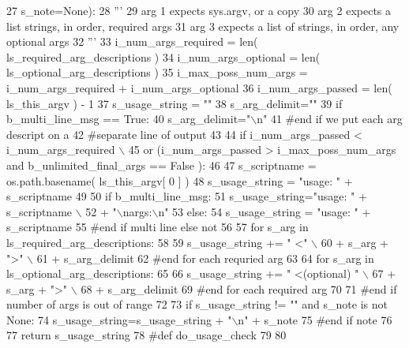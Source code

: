 \begin{DoxyCode}
27             s\_note=\textcolor{keywordtype}{None}):
28     \textcolor{stringliteral}{'''}
29 \textcolor{stringliteral}{    arg 1 expects sys.argv, or a copy}
30 \textcolor{stringliteral}{    arg 2 expects a list strings, in order, required args}
31 \textcolor{stringliteral}{    arg 3 expects a list of strings, in order, any optional args}
32 \textcolor{stringliteral}{    '''}
33     i\_num\_args\_required = len( ls\_required\_arg\_descriptions )
34     i\_num\_args\_optional = len( ls\_optional\_arg\_descriptions )
35     i\_max\_poss\_num\_args = i\_num\_args\_required + i\_num\_args\_optional 
36     i\_num\_args\_passed = len( ls\_this\_argv ) - 1  
37     s\_usage\_string = \textcolor{stringliteral}{""}
38     s\_arg\_delimit=\textcolor{stringliteral}{""}
39     \textcolor{keywordflow}{if} b\_multi\_line\_msg == \textcolor{keyword}{True}:
40         s\_arg\_delimit=\textcolor{stringliteral}{"\(\backslash\)n"}
41     \textcolor{comment}{#end if we put each arg descript on a }
42     \textcolor{comment}{#separate line of output}
43 
44     \textcolor{keywordflow}{if} i\_num\_args\_passed <  i\_num\_args\_required  \(\backslash\)
45             \textcolor{keywordflow}{or} (i\_num\_args\_passed > i\_max\_poss\_num\_args \textcolor{keywordflow}{and} b\_unlimited\_final\_args == \textcolor{keyword}{False} ): 
46     
47         s\_scriptname = os.path.basename( ls\_this\_argv[ 0 ] )    
48         s\_usage\_string = \textcolor{stringliteral}{"usage: "} + s\_scriptname 
49 
50         \textcolor{keywordflow}{if} b\_multi\_line\_msg:
51             s\_usage\_string=\textcolor{stringliteral}{"usage: "} + s\_scriptname \(\backslash\)
52                     + \textcolor{stringliteral}{"\(\backslash\)nargs:\(\backslash\)n"}
53         \textcolor{keywordflow}{else}:
54             s\_usage\_string = \textcolor{stringliteral}{"usage: "} + s\_scriptname 
55         \textcolor{comment}{#end if multi line else not}
56 
57         \textcolor{keywordflow}{for} s\_arg \textcolor{keywordflow}{in} ls\_required\_arg\_descriptions:
58 
59             s\_usage\_string += \textcolor{stringliteral}{" <"} \(\backslash\)
60                 + s\_arg + \textcolor{stringliteral}{">"} \(\backslash\)
61                 + s\_arg\_delimit
62         \textcolor{comment}{#end for each requried arg}
63 
64         \textcolor{keywordflow}{for} s\_arg \textcolor{keywordflow}{in} ls\_optional\_arg\_descriptions:
65 
66             s\_usage\_string += \textcolor{stringliteral}{" <(optional) "} \(\backslash\)
67                 + s\_arg + \textcolor{stringliteral}{">"} \(\backslash\)
68                 + s\_arg\_delimit
69         \textcolor{comment}{#end for each required arg}
70 
71     \textcolor{comment}{#end if number of args is out of range}
72 
73     \textcolor{keywordflow}{if} s\_usage\_string != \textcolor{stringliteral}{""} \textcolor{keywordflow}{and} s\_note \textcolor{keywordflow}{is} \textcolor{keywordflow}{not} \textcolor{keywordtype}{None}:
74         s\_usage\_string=s\_usage\_string + \textcolor{stringliteral}{"\(\backslash\)n"} + s\_note
75     \textcolor{comment}{#end if note }
76 
77     \textcolor{keywordflow}{return}  s\_usage\_string 
78 \textcolor{comment}{#def do\_usage\_check}
79 
80 
\end{DoxyCode}

